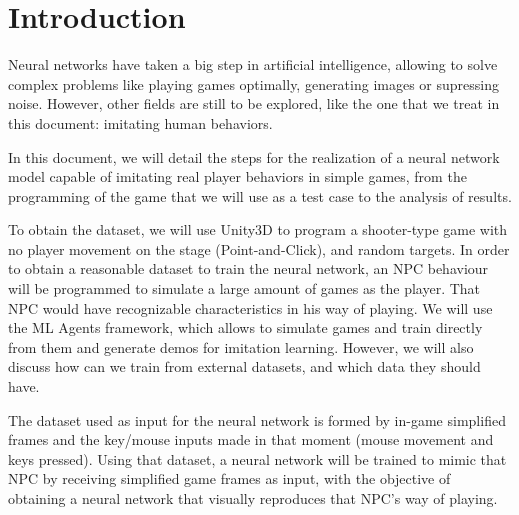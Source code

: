 %
%
%

\chapter{Introduction}

\minitoc{}

\bigskip{}

Neural networks have taken a big step in artificial intelligence, allowing to solve complex problems like playing games optimally, generating images or supressing noise. However, other fields are still to be explored, like the one that we treat in this document: imitating human behaviors.

In this document, we will detail the steps for the realization of a neural network model capable of imitating real player behaviors in simple games, from the programming of the game that we will use as a test case to the analysis of results.

To obtain the dataset, we will use Unity3D to program a shooter-type game with no player movement on the stage (Point-and-Click), and random targets. In order to obtain a reasonable dataset to train the neural network, an NPC behaviour will be programmed to simulate a large amount of games as the player. That NPC would have recognizable characteristics in his way of playing. We will use the ML Agents framework, which allows to simulate games and train directly from them and generate demos for imitation learning. However, we will also discuss how can we train from external datasets, and which data they should have.

The dataset used as input for the neural network is formed by in-game simplified frames and the key/mouse inputs made in that moment (mouse movement and keys pressed). Using that dataset, a neural network will be trained to mimic that NPC by receiving simplified game frames as input, with the objective of obtaining a neural network that visually reproduces that NPC’s way of playing.


